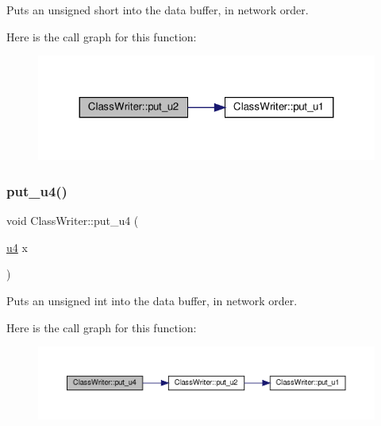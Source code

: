 Puts an unsigned short into the data buffer, in network order. 

Here is the call graph for this function\+:\nopagebreak
\begin{figure}[H]
\begin{center}
\leavevmode
\includegraphics[width=324pt]{classClassWriter_a0304019dd68dd830fac5c67971ed2070_cgraph}
\end{center}
\end{figure}
\mbox{\label{classClassWriter_aa6a42ab1ec0c2f85c30896506d6dbfce}} 
\subsubsection{\texorpdfstring{put\+\_\+u4()}{put\_u4()}}
{\footnotesize\ttfamily void Class\+Writer\+::put\+\_\+u4 (\begin{DoxyParamCaption}\item[{\hyperlink{types_8h_af3b2d4b29fd9faedc984db3e062b3d5d}{u4}}]{x }\end{DoxyParamCaption})\hspace{0.3cm}{\ttfamily [private]}}



Puts an unsigned int into the data buffer, in network order. 

Here is the call graph for this function\+:\nopagebreak
\begin{figure}[H]
\begin{center}
\leavevmode
\includegraphics[width=350pt]{classClassWriter_aa6a42ab1ec0c2f85c30896506d6dbfce_cgraph}
\end{center}
\end{figure}
\mbox{\label{classClassWriter_a7be4d13b5665b1e85a8a350ec181951c}} 

